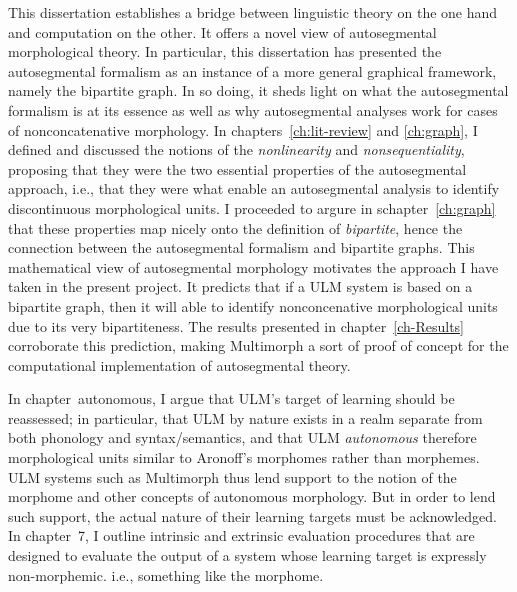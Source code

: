 This dissertation establishes a bridge between linguistic theory on the one hand and computation on the other. 
It offers a novel view of autosegmental morphological theory. In particular, this dissertation has presented the autosegmental formalism 
as an instance of a more general graphical framework, namely the bipartite graph. In so doing, it sheds light on what the autosegmental formalism
is at its essence as well as why autosegmental analyses work for cases of nonconcatenative morphology. In chapters~\ref{ch:lit-review} and \ref{ch:graph}, I
defined and discussed the notions of the \emph{nonlinearity} and \emph{nonsequentiality}, proposing that they were the two essential properties of the autosegmental approach, i.e., that they were what enable an autosegmental analysis to identify discontinuous morphological units. I proceeded to argure in schapter~\ref{ch:graph} that these properties map nicely onto the definition of \emph{bipartite}, hence the connection between the autosegmental formalism and bipartite graphs.
This mathematical view of autosegmental morphology motivates the approach I have taken in the present project. It predicts that if a ULM system is based on a bipartite graph, then it will able to identify nonconcenative morphological units due to its very bipartiteness. The results presented in chapter~\ref{ch-Results} corroborate this prediction, making Multimorph a sort of proof of concept for the computational implementation of autosegmental theory.

In chapter~{autonomous}, I argue that ULM's target of learning should be reassessed; in particular, that ULM by nature
exists in a realm separate from both phonology and syntax/semantics, and that ULM \emph{autonomous} therefore morphological units similar to Aronoff's morphomes \citep{aronoff:1994} rather than morphemes. ULM systems such as Multimorph thus lend support to the notion of the morphome and other concepts of autonomous morphology. But in order to lend such support, the actual nature of their learning targets must be acknowledged. In chapter~7, I outline intrinsic and extrinsic evaluation procedures that are designed to evaluate the output of a system whose learning target is expressly non-morphemic. i.e., something like the morphome.


